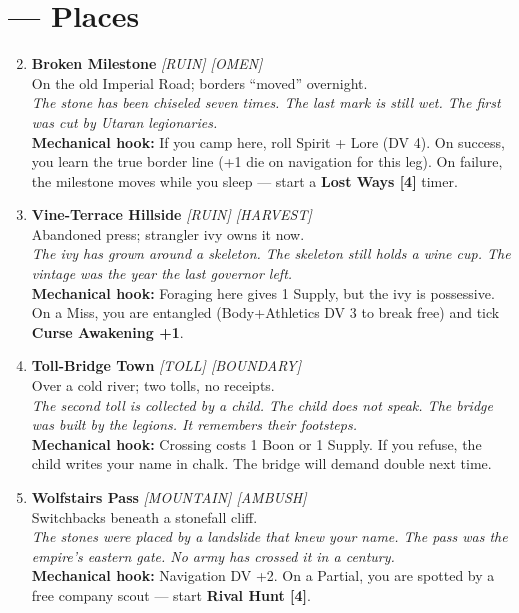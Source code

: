 \section*{ --- Places}
\label{sec:acasia-places}
\begin{enumerate}
\setcounter{enumi}{1}
\item \textbf{Broken Milestone} \hfill {} \textit{[RUIN] [OMEN]} \\
  On the old Imperial Road; borders ``moved'' overnight. \\
  \textit{The stone has been chiseled seven times. The last mark is still wet. The first was cut by Utaran legionaries.} \\
  \textbf{Mechanical hook:} If you camp here, roll Spirit + Lore (DV 4). On success, you learn the true border line (+1 die on navigation for this leg). On failure, the milestone moves while you sleep --- start a \textbf{Lost Ways [4]} timer.

\item \textbf{Vine-Terrace Hillside} \hfill {} \textit{[RUIN] [HARVEST]} \\
  Abandoned press; strangler ivy owns it now. \\
  \textit{The ivy has grown around a skeleton. The skeleton still holds a wine cup. The vintage was the year the last governor left.} \\
  \textbf{Mechanical hook:} Foraging here gives 1 Supply, but the ivy is possessive. On a Miss, you are entangled (Body+Athletics DV 3 to break free) and tick \textbf{Curse Awakening +1}.

\item \textbf{Toll-Bridge Town} \hfill {} \textit{[TOLL] [BOUNDARY]} \\
  Over a cold river; two tolls, no receipts. \\
  \textit{The second toll is collected by a child. The child does not speak. The bridge was built by the legions. It remembers their footsteps.} \\
  \textbf{Mechanical hook:} Crossing costs 1 Boon or 1 Supply. If you refuse, the child writes your name in chalk. The bridge will demand double next time.

\item \textbf{Wolfstairs Pass} \hfill {} \textit{[MOUNTAIN] [AMBUSH]} \\
  Switchbacks beneath a stonefall cliff. \\
  \textit{The stones were placed by a landslide that knew your name. The pass was the empire's eastern gate. No army has crossed it in a century.} \\
  \textbf{Mechanical hook:} Navigation DV +2. On a Partial, you are spotted by a free company scout --- start \textbf{Rival Hunt [4]}.


\end{enumerate}
